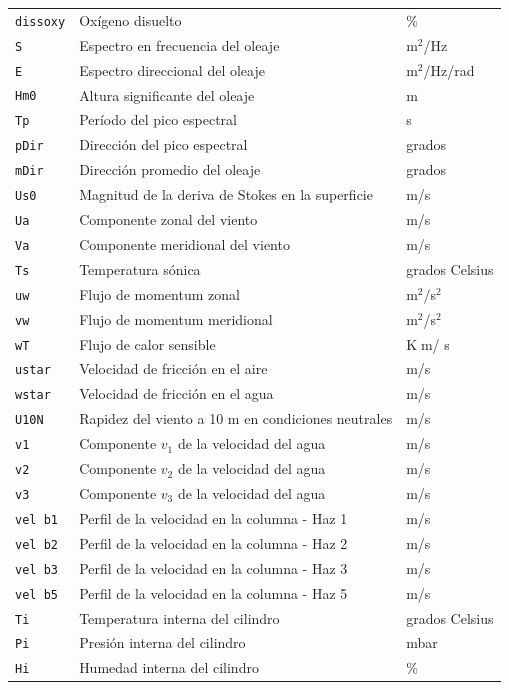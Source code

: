 \documentclass[11pt]{article}
\begin{document}
\begin{table}[htpb]
\begin{tabular}{l l l}
    \texttt{dissoxy} & Oxígeno disuelto & \% \\
    \texttt{S} & Espectro en frecuencia del oleaje & m$^2$/Hz \\
    \texttt{E} & Espectro direccional del oleaje & m$^2$/Hz/rad \\
    \texttt{Hm0} & Altura significante del oleaje & m \\
    \texttt{Tp} & Período del pico espectral & s \\
    \texttt{pDir} & Dirección del pico espectral & grados \\
    \texttt{mDir} & Dirección promedio del oleaje & grados \\
    \texttt{Us0} & Magnitud de la deriva de Stokes en la superficie & m/s \\
    \texttt{Ua} & Componente zonal del viento & m/s \\
    \texttt{Va} & Componente meridional del viento & m/s \\
    \texttt{Ts} & Temperatura sónica & grados Celsius \\
    \texttt{uw} & Flujo de momentum zonal & m$^2$/s$^2$ \\
    \texttt{vw} & Flujo de momentum meridional & m$^2$/s$^2$ \\
    \texttt{wT} & Flujo de calor sensible & K$\;$m/ s \\
    \texttt{ustar} & Velocidad de fricción en el aire & m/s \\
    \texttt{wstar} & Velocidad de fricción en el agua & m/s \\
    \texttt{U10N} & Rapidez del viento a 10 m en condiciones neutrales & m/s \\
    \texttt{v1} & Componente $v_1$ de la velocidad del agua & m/s \\
    \texttt{v2} & Componente $v_2$ de la velocidad del agua & m/s \\
    \texttt{v3} & Componente $v_3$ de la velocidad del agua & m/s \\
    \texttt{vel b1} & Perfil de la velocidad en la columna - Haz 1 & m/s \\
    \texttt{vel b2} & Perfil de la velocidad en la columna - Haz 2 & m/s \\
    \texttt{vel b3} & Perfil de la velocidad en la columna - Haz 3 & m/s \\
    \texttt{vel b5} & Perfil de la velocidad en la columna - Haz 5 & m/s \\
    \texttt{Ti} & Temperatura interna del cilindro & grados Celsius \\
    \texttt{Pi} & Presión interna del cilindro & mbar \\
    \texttt{Hi} & Humedad interna del cilindro & \% \\
    \bottomrule
  \end{tabular}
\end{table}
\end{document}
